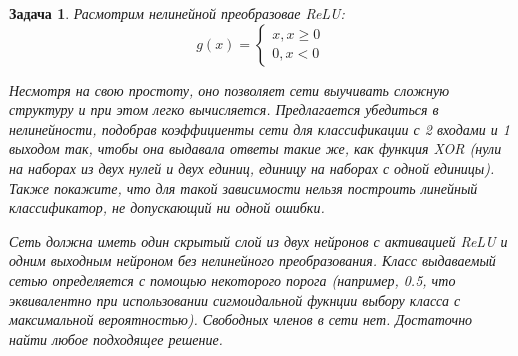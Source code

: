 \documentclass[12pt,fleqn]{article}
\newtheorem{esProblem}{Задача}
\begin{document}
    \begin{esProblem}
        Расмотрим нелинейной преобразовае ReLU: 
        $$g(x) = \begin{cases} x, x \ge 0 \\ 0, x < 0 \end{cases}$$

        Несмотря на свою простоту, оно позволяет сети выучивать сложную структуру и при этом легко вычисляется. Предлагается убедиться в нелинейности, подобрав коэффициенты сети для классификации с 2 входами и 1 выходом так, чтобы она выдавала ответы такие же, как функция XOR (нули на наборах из двух нулей и двух единиц, единицу на наборах с одной единицы). Также покажите, что для такой зависимости нельзя построить линейный классификатор, не допускающий ни одной ошибки.

        Сеть должна иметь один скрытый слой из двух нейронов с активацией ReLU и одним выходным нейроном без нелинейного преобразования. Класс выдаваемый сетью определяется с помощью некоторого порога (например, 0.5, что эквивалентно при использовании сигмоидальной фукнции выбору класса с максимальной вероятностью). Свободных членов в сети нет. Достаточно найти любое подходящее решение.
    \end{esProblem}
\end{document}
